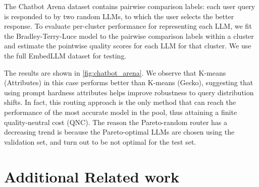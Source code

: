 The Chatbot Arena dataset contains pairwise comparison labels: each user query is responded to by two random LLMs, to which the user selects the better response. To evaluate per-cluster performance for representing each LLM, we fit the Bradley-Terry-Luce model \citep{bradley1952rank} to the pairwise comparison labels within a cluster and estimate the pointwise quality scores for each LLM for that cluster. We use the full EmbedLLM dataset for testing.


The results are shown in \cref{fig:chatbot_arena}.
We observe that K-means (Attributes) in this case performs better than K-means (Gecko), suggesting that using prompt hardness attributes helps improve robustness to query distribution shifts. 
In fact, this routing approach is the only method that can reach the performance of the most accurate model in the pool, thus attaining a finite quality-neutral cost (QNC). The reason the Pareto-random router has a decreasing trend is because the Pareto-optimal LLMs are chosen using the validation set, and turn out to be not optimal for the test set.

\ifarxiv
\else
\section{Additional Related work}
\label{app:related}

\fi

